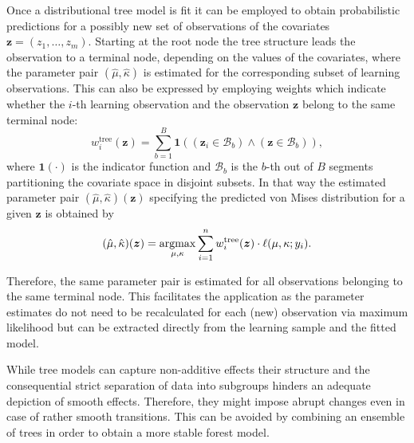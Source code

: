 \documentclass[nojss]{jss}
\newcommand{\argmax}{\operatorname{argmax}\displaylimits}
\numberwithin{equation}{section}
\begin{document}
Once a distributional tree model is fit it can be employed to obtain probabilistic predictions
for a possibly new set of observations of the covariates $\bm{z} = (z_1, \ldots, z_m)$.
Starting at the root node the tree structure leads the observation to a terminal node, depending on the values of the covariates, where the parameter pair $(\hat{\mu}, \hat{\kappa})$ is estimated for
the corresponding subset of learning observations. 
This can also be expressed by employing weights which indicate whether the $i$-th learning observation and the observation $\bm{z}$ belong to the same terminal
node:
\begin{equation}
w^{\text{tree}}_i(\bm{z}) = \sum_{b=1}^B \mathbf{1}((\bm{z}_i \in \mathcal{B}_b) \land (\bm{z} \in \mathcal{B}_b)),
\end{equation}
where $\mathbf{1}(\cdot)$ is the indicator function and $\mathcal{B}_b$ is the $b$-th out of $B$ segments
partitioning the covariate space in disjoint subsets. 
In that way the estimated parameter pair $(\hat{\mu},\hat{\kappa})(\bm{z})$ specifying the predicted
von Mises distribution for a given $\bm{z}$ is obtained by
\begin{equation}
(\hat{\mu},\hat{\kappa})(\bm{z}) = \argmax_{\mu,\kappa} \sum_{i=1}^n w^{\text{tree}}_i(\bm{z}) \cdot \ell(\mu,\kappa; y_i).
\end{equation}

Therefore, the same parameter pair is estimated for all observations
belonging to the same terminal node. This facilitates the application as the parameter estimates do 
not need to be recalculated for each (new) observation via maximum likelihood but can be extracted 
directly from the learning sample and the fitted model.

While tree models can capture non-additive effects their structure and the consequential strict 
separation of data into subgroups hinders an adequate depiction of smooth effects. Therefore, 
they might impose abrupt changes even in case of rather smooth transitions. This can be avoided 
by combining an ensemble of trees in order to obtain a more stable forest model. 
\end{document}
